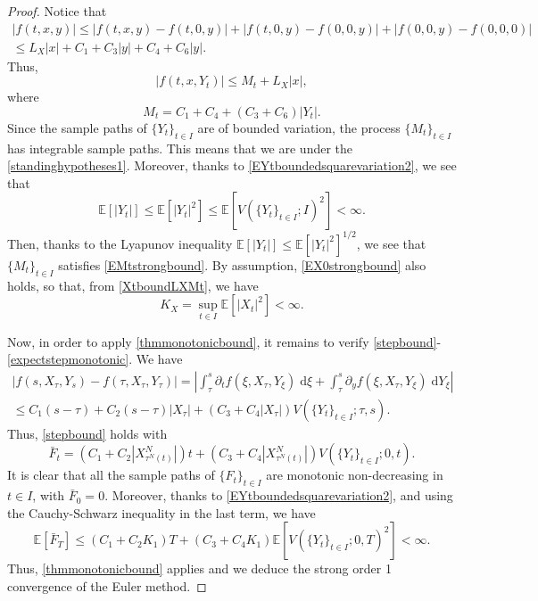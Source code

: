 \documentclass[reqno,12pt]{amsart}
\theoremstyle{plain}%
\theoremstyle{definition}
\begin{document}
\begin{proof}
    Notice that
    \begin{multline*}
        |f(t, x, y)| \leq |f(t, x, y) - f(t, 0, y)| + |f(t, 0, y) - f(0, 0, y)| + |f(0, 0, y) - f(0, 0, 0)| \\
        \leq L_X |x| + C_1 + C_3|y| + C_4 + C_6|y|. 
    \end{multline*}
    Thus,
    \[
        |f(t, x, Y_t)| \leq M_t + L_X |x|,
    \]
    where
    \[
        M_t = C_1 + C_4 + (C_3 + C_6)|Y_t|.
    \]
    Since the sample paths of $\{Y_t\}_{t\in I}$ are of bounded variation, the process $\{M_t\}_{t\in I}$ has integrable sample paths. This means that we are under the \cref{standinghypotheses1}. Moreover, thanks to \eqref{EYtboundedsquarevariation2}, we see that
    \[
        \mathbb{E}[|Y_t|] \leq \mathbb{E}[|Y_t|^2] \leq \mathbb{E}[V(\{Y_t\}_{t\in I}; I)^2] < \infty.
    \]
    Then, thanks to the Lyapunov inequality $\mathbb{E}[|Y_t|] \leq \mathbb{E}[|Y_t|^2]^{1/2}$, we see that $\{M_t\}_{t\in I}$ satisfies \eqref{EMtstrongbound}. By assumption, \eqref{EX0strongbound} also holds, so that, from \eqref{XtboundLXMt}, we have
    \[
        K_X = \sup_{t\in I}\mathbb{E}[|X_t|^2] < \infty.
    \]

    Now, in order to apply \cref{thmmonotonicbound}, it remains to verify \eqref{stepbound}-\eqref{expectstepmonotonic}. We have
    \begin{multline*}
        |f(s, X_\tau, Y_s) - f(\tau, X_\tau, Y_\tau)| = \left|\int_\tau^s \partial_t f(\xi, X_\tau, Y_\xi) \;\mathrm{d}\xi + \int_\tau^s \partial_y f(\xi, X_\tau, Y_\xi) \;\mathrm{d}Y_\xi\right| \\
        \leq C_1 (s-\tau) + C_2(s-\tau) |X_\tau| + (C_3 + C_4 |X_\tau|) V(\{Y_t\}_{t\in I}; \tau, s).
    \end{multline*}
    Thus, \eqref{stepbound} holds with
    \[
        \bar F_t = (C_1 + C_2 |X_{\tau^N(t)}^N|)t + (C_3 + C_4 |X_{\tau^N(t)}^N|) V(\{Y_t\}_{t\in I}; 0, t).
    \]
    It is clear that all the sample paths of $\{F_t\}_{t\in I}$ are monotonic non-decreasing in $t\in I$, with $\bar F_0 = 0$. Moreover, thanks to \eqref{EYtboundedsquarevariation2}, and using the Cauchy-Schwarz inequality in the last term, we have
    \[
        \mathbb{E}[\bar F_T] \leq (C_1 + C_2 K_1)T + (C_3 + C_4K_1)\mathbb{E}[V(\{Y_t\}_{t\in I}; 0, T)^2] < \infty.
    \]
    Thus, \cref{thmmonotonicbound} applies and we deduce the strong order 1 convergence of the Euler method.
\end{proof}
\end{document}
